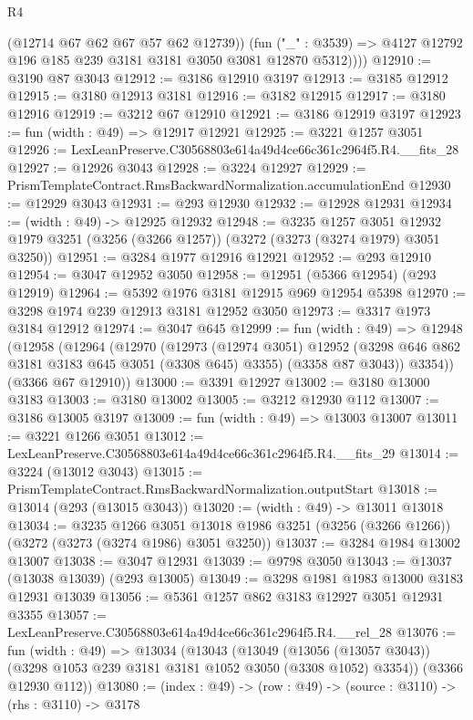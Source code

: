 \begin{lexlean}{R4}
\begin{coremodule}
            (@12714 @67 @62 @67 @57 @62 @12739))
          (fun ("_" : @3539) => @4127 @12792 @196 @185 @239 @3181 @3181 @3050 @3081 @12870 @5312))))
@12910 := @3190 @87 @3043
@12912 := @3186 @12910 @3197
@12913 := @3185 @12912
@12915 := @3180 @12913 @3181
@12916 := @3182 @12915
@12917 := @3180 @12916
@12919 := @3212 @67 @12910
@12921 := @3186 @12919 @3197
@12923 := fun (width : @49) => @12917 @12921
@12925 := @3221 @1257 @3051
@12926 := LexLeanPreserve.C30568803e614a49d4ce66c361c2964f5.R4.__fits_28
@12927 := @12926 @3043
@12928 := @3224 @12927
@12929 := PrismTemplateContract.RmsBackwardNormalization.accumulationEnd
@12930 := @12929 @3043
@12931 := @293 @12930
@12932 := @12928 @12931
@12934 := (width : @49) -> @12925 @12932
@12948 := @3235
    @1257
    @3051
    @12932
    @1979
    @3251
    (@3256 (@3266 @1257))
    (@3272 (@3273 (@3274 @1979) @3051 @3250))
@12951 := @3284 @1977 @12916 @12921
@12952 := @293 @12910
@12954 := @3047 @12952 @3050
@12958 := @12951 (@5366 @12954) (@293 @12919)
@12964 := @5392 @1976 @3181 @12915 @969 @12954 @5398
@12970 := @3298 @1974 @239 @12913 @3181 @12952 @3050
@12973 := @3317 @1973 @3184 @12912
@12974 := @3047 @645
@12999 := fun (width : @49) =>
  @12948
    (@12958
      (@12964
        (@12970
          (@12973
            (@12974 @3051)
            @12952
            (@3298 @646 @862 @3181 @3183 @645 @3051 (@3308 @645) @3355)
            (@3358 @87 @3043))
          @3354))
      (@3366 @67 @12910))
@13000 := @3391 @12927
@13002 := @3180 @13000 @3183
@13003 := @3180 @13002
@13005 := @3212 @12930 @112
@13007 := @3186 @13005 @3197
@13009 := fun (width : @49) => @13003 @13007
@13011 := @3221 @1266 @3051
@13012 := LexLeanPreserve.C30568803e614a49d4ce66c361c2964f5.R4.__fits_29
@13014 := @3224 (@13012 @3043)
@13015 := PrismTemplateContract.RmsBackwardNormalization.outputStart
@13018 := @13014 (@293 (@13015 @3043))
@13020 := (width : @49) -> @13011 @13018
@13034 := @3235
    @1266
    @3051
    @13018
    @1986
    @3251
    (@3256 (@3266 @1266))
    (@3272 (@3273 (@3274 @1986) @3051 @3250))
@13037 := @3284 @1984 @13002 @13007
@13038 := @3047 @12931
@13039 := @9798 @3050
@13043 := @13037 (@13038 @13039) (@293 @13005)
@13049 := @3298 @1981 @1983 @13000 @3183 @12931 @13039
@13056 := @5361 @1257 @862 @3183 @12927 @3051 @12931 @3355
@13057 := LexLeanPreserve.C30568803e614a49d4ce66c361c2964f5.R4.__rel_28
@13076 := fun (width : @49) =>
  @13034
    (@13043
      (@13049
        (@13056 (@13057 @3043))
        (@3298 @1053 @239 @3181 @3181 @1052 @3050 (@3308 @1052) @3354))
      (@3366 @12930 @112))
@13080 := (index : @49) -> (row : @49) -> (source : @3110) -> (rhs : @3110) -> @3178

\end{coremodule}
\end{lexlean}
